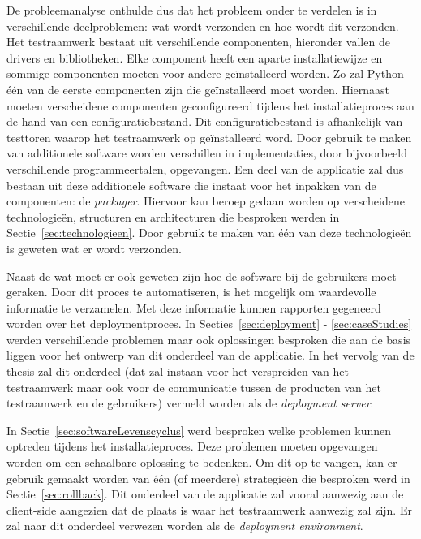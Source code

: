 De probleemanalyse onthulde dus dat het probleem onder te verdelen is in verschillende deelproblemen: wat wordt verzonden en hoe wordt dit verzonden.
Het testraamwerk bestaat uit verschillende componenten, hieronder vallen de drivers en bibliotheken.
Elke component heeft een aparte installatiewijze en sommige componenten moeten voor andere geïnstalleerd worden.
Zo zal Python één van de eerste componenten zijn die geïnstalleerd moet worden.
Hiernaast moeten verscheidene componenten geconfigureerd tijdens het installatieproces aan de hand van een configuratiebestand.
Dit configuratiebestand is afhankelijk van testtoren waarop het testraamwerk op geïnstalleerd word.
Door gebruik te maken van additionele software worden verschillen in implementaties, door bijvoorbeeld verschillende programmeertalen, opgevangen.
Een deel van de applicatie zal dus bestaan uit deze additionele software die instaat voor het inpakken van de componenten: de \emph{packager}.
Hiervoor kan beroep gedaan worden op verscheidene technologieën, structuren en architecturen die besproken werden in Sectie~\ref{sec:technologieen}.
Door gebruik te maken van één van deze technologieën is geweten wat er wordt verzonden.

Naast de wat moet er ook geweten zijn hoe de software bij de gebruikers moet geraken.
Door dit proces te automatiseren, is het mogelijk om waardevolle informatie te verzamelen.
Met deze informatie kunnen rapporten gegeneerd worden over het deploymentproces.
In Secties~\ref{sec:deployment} - \ref{sec:caseStudies} werden verschillende problemen maar ook oplossingen besproken die aan de basis liggen voor het ontwerp van dit onderdeel van de applicatie. 
In het vervolg van de thesis zal dit onderdeel (dat zal instaan voor het verspreiden van het testraamwerk maar ook voor de communicatie tussen de producten van het testraamwerk en de gebruikers) vermeld worden als de \emph{deployment server}.

In Sectie~\ref{sec:softwareLevenscyclus} werd besproken welke problemen kunnen optreden tijdens het installatieproces.
Deze problemen moeten opgevangen worden om een schaalbare oplossing te bedenken.
Om dit op te vangen, kan er gebruik gemaakt worden van één (of meerdere) strategieën die besproken werd in Sectie~\ref{sec:rollback}.
Dit onderdeel van de applicatie zal vooral aanwezig aan de client-side aangezien dat de plaats is waar het testraamwerk aanwezig zal zijn.
Er zal naar dit onderdeel verwezen worden als de \emph{deployment environment}.

